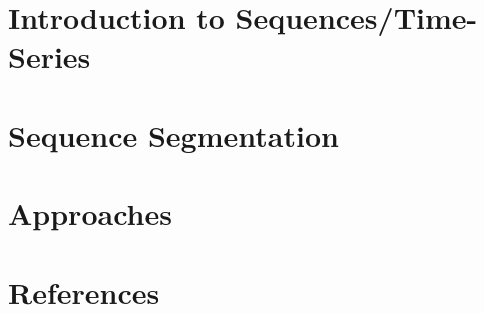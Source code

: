 \section[Seq]{Introduction to Sequences/Time-Series}


\section[SeqSeg]{Sequence Segmentation}



\section[App]{Approaches}


\section[Refs]{References}


